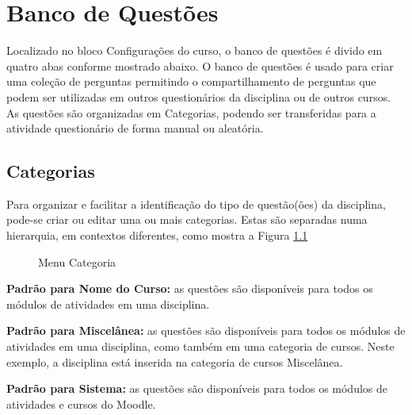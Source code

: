 \chapter{Banco de Questões}
\label{cap6}



Localizado no bloco Configurações do curso, o banco de questões é divido em quatro abas conforme mostrado abaixo. O banco de questões é usado para criar uma coleção de perguntas permitindo o compartilhamento de perguntas que podem ser utilizadas em outros questionários da disciplina ou de outros cursos. As questões são organizadas em Categorias, podendo ser transferidas para a atividade questionário de forma manual ou aleatória. 

\section{Categorias}
Para organizar e facilitar a identificação do tipo de questão(ões) da disciplina, pode-se criar ou editar uma ou mais categorias. Estas são separadas numa hierarquia, em contextos diferentes, como mostra a Figura \ref{fig:cap6_26}

\begin{figure}[htbp]
 \begin{center}
  \caption{Menu Categoria}
  \label{fig:cap6_26}
 \end{center}
\end{figure}

\textbf{Padrão para Nome do Curso:} as questões são disponíveis para todos os módulos de atividades em uma disciplina.

\textbf{Padrão para Miscelânea:} as questões são disponíveis para todos os módulos de atividades em uma disciplina, como também em uma categoria de cursos. Neste exemplo, a disciplina está inserida na categoria de cursos Miscelânea.

\textbf{Padrão para Sistema: }as questões são disponíveis para todos os módulos de atividades e cursos do Moodle.

